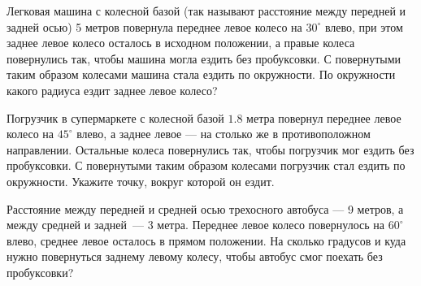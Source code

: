 ﻿
\begin{enumerate}

\itA Легковая машина с колесной базой (так называют расстояние между передней и задней осью) 5 метров повернула переднее левое колесо на $30^\circ$ влево, при этом заднее левое колесо осталось в исходном положении, а правые колеса повернулись так, чтобы машина могла ездить без пробуксовки. С повернутыми таким образом колесами машина стала ездить по окружности. По окружности какого радиуса ездит заднее левое колесо?

\itB Погрузчик в супермаркете с колесной базой $1.8$ метра повернул переднее левое колесо на $45^\circ$ влево, а заднее левое — на столько же в противоположном направлении. Остальные колеса повернулись так, чтобы погрузчик мог ездить без пробуксовки. С повернутыми таким образом колесами погрузчик стал ездить по окружности. Укажите точку, вокруг которой он ездит.

\itC Расстояние между передней и средней осью трехосного автобуса — 9 метров, а между средней и задней~— 3 метра. Переднее левое колесо повернулось на $60^\circ$ влево, среднее левое осталось в прямом положении. На сколько градусов и куда нужно повернуться заднему левому колесу, чтобы автобус смог поехать без пробуксовки?
\end{enumerate}